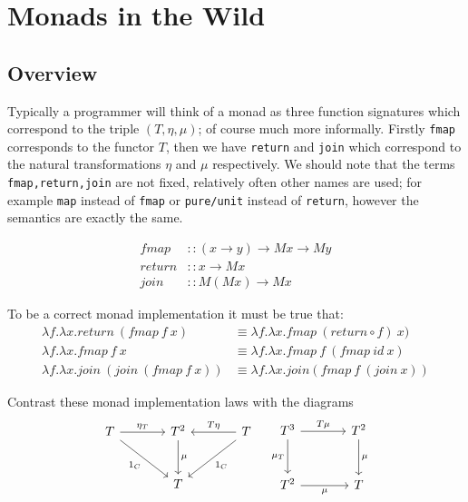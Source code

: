 \section{Monads in the Wild}
\subsection{Overview}
Typically a programmer will think of a monad as three function signatures
which correspond to the triple $(T,\eta,\mu)$;
of course much more informally.
Firstly \texttt{fmap} corresponds to the functor $T$,
then we have \texttt{return} and \texttt{join} which correspond to
the natural transformations $\eta$ and $\mu$ respectively.
We should note that the terms \texttt{fmap,return,join}
are not fixed, relatively often other names are used;
for example \texttt{map} instead of \texttt{fmap}
or \texttt{pure/unit} instead of \texttt{return},
however the semantics are exactly the same.

\begin{equation}
  \begin{split}
    fmap   &:: (x \rightarrow y) \rightarrow M x \rightarrow M y \\
    return &:: x \rightarrow M x                                 \\
    join   &:: M (M x) \rightarrow M x
  \end{split}
\end{equation}

To be a correct monad implementation it must be true that:
\begin{equation}
  \begin{split}
      \lambda f.\lambda x.return\ (fmap\ f\ x)
      &\equiv
      \lambda f.\lambda x.fmap\ (return \circ f)\ x)
      \\
      \lambda f.\lambda x.fmap\ f\ x
      &\equiv
      \lambda f.\lambda x.fmap\ f\ (fmap\ id\ x)
      \\
      \lambda f.\lambda x.join\ (join\ (fmap\ f\ x))
      &\equiv
      \lambda f.\lambda x.join(fmap\ f\ (join\ x))
  \end{split}
\end{equation}

Contrast these monad implementation laws with the diagrams
\begin{equation}
    \begin{tikzcd}[sep=large]
        T \rar{\eta_T} \drar[swap]{1_{C}} & T^2 \dar{\mu} & \lar[swap]{T\eta} \dlar{1_{C}} T \\
                                           & T            &
    \end{tikzcd}
    \quad
    \begin{tikzcd}[sep=large]
        T^3 \rar{T\mu} \dar[swap]{\mu_T} & T^2 \dar{\mu} \\
        T^2 \rar[swap]{\mu}                    & T
    \end{tikzcd}
\end{equation}

